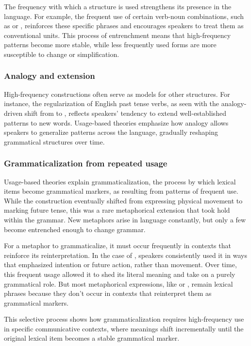 The frequency with which a structure is used strengthens its presence in the language. For example, the frequent use of certain verb-noun combinations, such as  or , reinforces these specific phrases and encourages speakers to treat them as conventional units. This process of entrenchment means that high-frequency patterns become more stable, while less frequently used forms are more susceptible to change or simplification.

\subsubsection{Analogy and extension}

High-frequency constructions often serve as models for other structures. For instance, the regularization of English past tense verbs, as seen with the analogy-driven shift from  to , reflects speakers' tendency to extend well-established patterns to new words. Usage-based theories emphasize how analogy allows speakers to generalize patterns across the language, gradually reshaping grammatical structures over time.

\subsubsection{Grammaticalization from repeated usage}

Usage-based theories explain grammaticalization, the process by which lexical items become grammatical markers, as resulting from patterns of frequent use. While the  construction eventually shifted from expressing physical movement to marking future tense, this was a rare metaphorical extension that took hold within the grammar. New metaphors arise in language constantly, but only a few become entrenched enough to change grammar.

For a metaphor to grammaticalize, it must occur frequently in contexts that reinforce its reinterpretation. In the case of , speakers consistently used it in ways that emphasized intention or future action, rather than movement. Over time, this frequent usage allowed it to shed its literal meaning and take on a purely grammatical role. But most metaphorical expressions, like  or , remain lexical phrases because they don't occur in contexts that reinterpret them as grammatical markers. 

This selective process shows how grammaticalization requires high-frequency use in specific communicative contexts, where meanings shift incrementally until the original lexical item becomes a stable grammatical marker.

